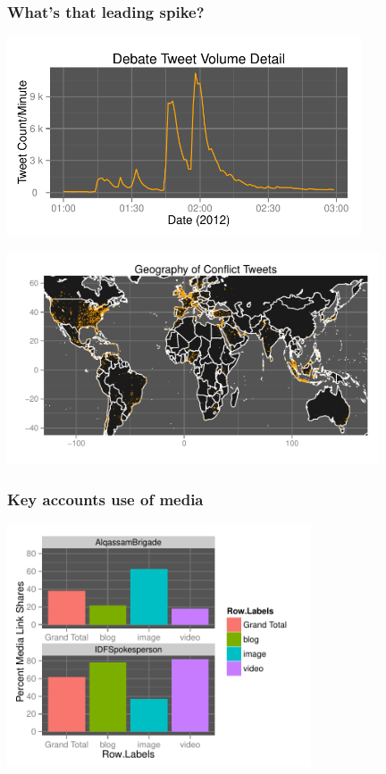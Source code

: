 \documentclass{beamer}
\begin{document}
\begin{frame}\frametitle{What's that leading spike?}
  \begin{center}
    \includegraphics[width=10.5cm]{./imgs/HI_minimal-leadup-pres-debate.pdf}
  \end{center}
\end{frame}

\begin{frame}
  \begin{center}
    \includegraphics[width=11cm]{./imgs/HI_minimal-target-geo.pdf}
  \end{center}
\end{frame}

\begin{frame}\frametitle{Key accounts use of media}
  \begin{center}
    \includegraphics[width=9cm]{./imgs/HI_minimal-media.pdf}
  \end{center}
\end{frame}
\end{document}
